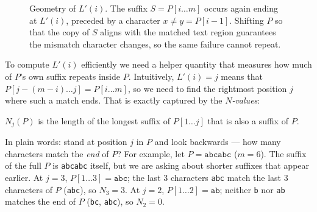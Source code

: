 \begin{figure}[H]
\centering
{}
\caption{Geometry of $L'(i)$. The suffix $S = P[i\ldots m]$ occurs again
  ending at $L'(i)$, preceded by a character $x \neq y = P[i{-}1]$.
  Shifting $P$ so that the copy of $S$ aligns with the matched text region
  guarantees the mismatch character changes, so the same failure cannot repeat.}
\label{fig:gsr-lprime}
\end{figure}

To compute $L'(i)$ efficiently we need a helper quantity that measures
how much of $P$'s own suffix repeats inside $P$.
Intuitively, $L'(i) = j$ means that $P[j-(m-i)\ldots j] = P[i\ldots m]$,
so we need to find the rightmost position $j$ where such a match ends.
That is exactly captured by the \emph{$N$-values}:

\begin{definition}[$N_j(P)$]
  $N_j(P)$ is the length of the longest suffix of $P[1\ldots j]$ that is
  also a suffix of $P$.
\end{definition}

In plain words: stand at position $j$ in $P$ and look backwards ---
how many characters match the \emph{end} of $P$?
For example, let $P = \texttt{abcabc}$ ($m = 6$).
The suffix of the full $P$ is \texttt{abcabc} itself, but we are asking
about shorter suffixes that appear earlier.
At $j = 3$, $P[1\ldots3] = \texttt{abc}$; the last 3 characters
\texttt{abc} match the last 3 characters of $P$ (\texttt{abc}), so
$N_3 = 3$.
At $j = 2$, $P[1\ldots2] = \texttt{ab}$; neither \texttt{b} nor
\texttt{ab} matches the end of $P$ (\texttt{bc}, \texttt{abc}), so
$N_2 = 0$.

